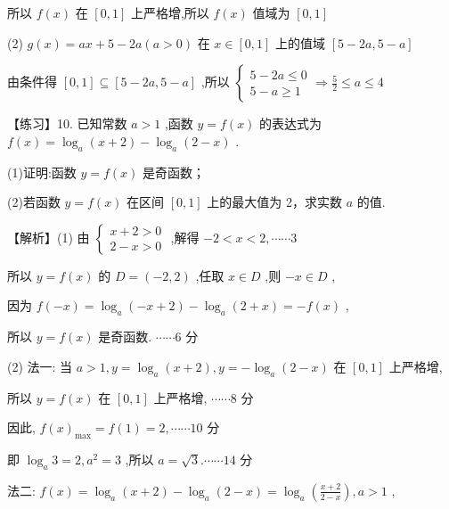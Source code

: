 \documentclass[10pt]{article}
\begin{document}
所以 \(f\left( x\right)\) 在 \(\left\lbrack  {0,1}\right\rbrack\) 上严格增,所以 \(f\left( x\right)\) 值域为 \(\left\lbrack  {0,1}\right\rbrack\)

(2) \(g\left( x\right)  = {ax} + 5 - {2a}\left( {a > 0}\right)\) 在 \(x \in  \left\lbrack  {0,1}\right\rbrack\) 上的值域 \(\left\lbrack  {5 - {2a},5 - a}\right\rbrack\)

由条件得 \(\left\lbrack  {0,1}\right\rbrack   \subseteq  \left\lbrack  {5 - {2a},5 - a}\right\rbrack\) ,所以 \(\left\{  {\begin{array}{l} 5 - {2a} \leq  0 \\  5 - a \geq  1 \end{array} \Rightarrow  \frac{5}{2} \leq  a \leq  4}\right.\)

【练习】10. 已知常数 \(a > 1\) ,函数 \(y = f\left( x\right)\) 的表达式为 \(f\left( x\right)  = {\log }_{a}\left( {x + 2}\right)  - {\log }_{a}\left( {2 - x}\right)\) .

(1)证明:函数 \(y = f\left( x\right)\) 是奇函数；

(2)若函数 \(y = f\left( x\right)\) 在区间 \(\left\lbrack  {0,1}\right\rbrack\) 上的最大值为 2，求实数 \(a\) 的值.

【解析】(1) 由 \(\left\{  \begin{array}{l} x + 2 > 0 \\  2 - x > 0 \end{array}\right.\) ,解得 \(- 2 < x < 2,\cdots \cdots 3\)

所以 \(y = f\left( x\right)\) 的 \(D = \left( {-2,2}\right)\) ,任取 \(x \in  D\) ,则 \(- x \in  D\) ,

因为 \(f\left( {-x}\right)  = {\log }_{a}\left( {-x + 2}\right)  - {\log }_{a}\left( {2 + x}\right)  =  - f\left( x\right)\) ,

所以 \(y = f\left( x\right)\) 是奇函数. \(\cdots \cdots 6\) 分

(2) 法一: 当 \(a > 1,y = {\log }_{a}\left( {x + 2}\right) ,y =  - {\log }_{a}\left( {2 - x}\right)\) 在 \(\left\lbrack  {0,1}\right\rbrack\) 上严格增,

所以 \(y = f\left( x\right)\) 在 \(\left\lbrack  {0,1}\right\rbrack\) 上严格增, \(\cdots \cdots 8\) 分

因此, \(f{\left( x\right) }_{\max } = f\left( 1\right)  = 2,\cdots \cdots {10}\) 分

即 \({\log }_{a}3 = 2,{a}^{2} = 3\) ,所以 \(a = \sqrt{3}.\cdots \cdots {14}\) 分

法二: \(f\left( x\right)  = {\log }_{a}\left( {x + 2}\right)  - {\log }_{a}\left( {2 - x}\right)  = {\log }_{a}\left( \frac{x + 2}{2 - x}\right) ,a > 1\) ,
\end{document}
